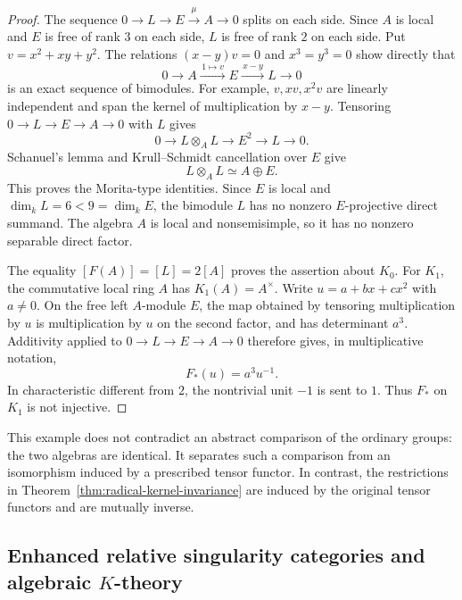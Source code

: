 \documentclass[12pt,a4paper,english,reqno]{amsart}
\numberwithin{equation}{section}
\theoremstyle{plain}
\theoremstyle{definition}
\begin{document}
\begin{proof}
The sequence $0\to L\to E\xrightarrow{\mu}A\to0$ splits on each
side. Since $A$ is local and $E$ is free of rank $3$ on each side,
$L$ is free of rank $2$ on each side. Put $v=x^2+xy+y^2$.
The relations $(x-y)v=0$ and $x^3=y^3=0$ show directly that
\[
 0\longrightarrow A\xrightarrow{\,1\mapsto v\,}E
   \xrightarrow{\,x-y\,}L\longrightarrow0
\]
is an exact sequence of bimodules. For example, $v,xv,x^2v$
are linearly independent and span the kernel of multiplication
by $x-y$. Tensoring $0\to L\to E\to A\to0$ with $L$ gives
\[
 0\longrightarrow L\otimes_A L\longrightarrow E^2
   \longrightarrow L\longrightarrow0.
\]
Schanuel's lemma and Krull--Schmidt cancellation over $E$ give
\begin{equation}\label{eq:k-syzygy-square}
                  L\otimes_A L\simeq A\oplus E.
\end{equation}
This proves the Morita-type identities. Since $E$ is local and
$\dim_kL=6<9=\dim_kE$, the bimodule $L$ has no nonzero
$E$-projective direct summand. The algebra $A$ is local and
nonsemisimple, so it has no nonzero separable direct factor.

The equality $[F(A)]=[L]=2[A]$ proves the assertion about $K_0$.
For $K_1$, the commutative local ring $A$ has
$K_1(A)=A^\times$. Write $u=a+bx+cx^2$ with $a\ne0$.
On the free left $A$-module $E$, the map obtained by tensoring
multiplication by $u$ is multiplication by $u$ on the second
factor, and has determinant $a^3$. Additivity applied to
$0\to L\to E\to A\to0$ therefore gives, in multiplicative
notation,
\begin{equation}\label{eq:k-syzygy-units}
                         F_*(u)=a^3u^{-1}.
\end{equation}
In characteristic different from $2$, the nontrivial unit $-1$
is sent to $1$. Thus $F_*$ on $K_1$ is not injective.
\end{proof}

This example does not contradict an abstract comparison of the
ordinary groups: the two algebras are identical. It separates
such a comparison from an isomorphism induced by a prescribed
tensor functor. In contrast, the restrictions in
Theorem~\ref{thm:radical-kernel-invariance} are induced by the
original tensor functors and are mutually inverse.

\subsection{Enhanced relative singularity categories and algebraic \texorpdfstring{$K$}{K}-theory}
\label{subsec:enhanced-relative-singular-k}
\end{document}
